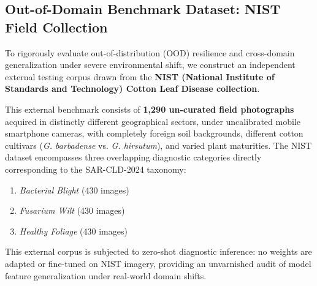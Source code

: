 \documentclass[journal,10pt,twocolumn]{IEEEtran}
\begin{document}
\begin{table}[htbp]
\centering
\caption{Class distribution across the un-augmented SAR-CLD-2024 dataset.}
\label{tab:dataset_split}
\end{table}

\subsection{Out-of-Domain Benchmark Dataset: NIST Field Collection}
To rigorously evaluate out-of-distribution (OOD) resilience and cross-domain generalization under severe environmental shift, we construct an independent external testing corpus drawn from the \textbf{NIST (National Institute of Standards and Technology) Cotton Leaf Disease collection}.

This external benchmark consists of \textbf{1,290 un-curated field photographs} acquired in distinctly different geographical sectors, under uncalibrated mobile smartphone cameras, with completely foreign soil backgrounds, different cotton cultivars (\textit{G. barbadense} vs. \textit{G. hirsutum}), and varied plant maturities. The NIST dataset encompasses three overlapping diagnostic categories directly corresponding to the SAR-CLD-2024 taxonomy:
\begin{enumerate}[leftmargin=*]
    \item \textit{Bacterial Blight} (430 images)
    \item \textit{Fusarium Wilt} (430 images)
    \item \textit{Healthy Foliage} (430 images)
\end{enumerate}
This external corpus is subjected to zero-shot diagnostic inference: no weights are adapted or fine-tuned on NIST imagery, providing an unvarnished audit of model feature generalization under real-world domain shifts.
\end{document}
